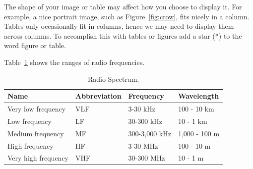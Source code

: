 \documentclass[pdf,bookmarks,colorlinks=true]{IEEEtran}
\begin{document}
The shape of your image or table may affect how you choose to display it. For example, a nice portrait image, such as Figure~\ref{fig:crow}, fits nicely in a column. Tables only occasionally fit in columns, hence we may need to display them across columns. To accomplish this with tables or figures add a star (*) to the word figure or table. 

Table~\ref{tbl:frequencies} shows the ranges of radio frequencies.

\begin{table}[htb]
    \centering
    \caption{Radio Spectrum.}
    \label{tbl:frequencies}
    \begin{tabular}{|l|l|l|l|}
        \hline
        \textbf{Name} & \textbf{Abbreviation} & \textbf{Frequency} & \textbf{Wavelength} \\
        \hline \hline
        Very low frequency & VLF & 3-30 kHz & 100 - 10 km \\ \hline
        Low frequency & LF & 30-300 kHz & 10 - 1 km \\ \hline
        Medium frequency & MF & 300-3,000 kHz & 1,000 - 100 m \\ \hline
        High frequency & HF & 3-30 MHz  & 100 - 10 m \\ \hline
        Very high frequency & VHF & 30-300 MHz & 10 - 1 m \\ \hline        
    \end{tabular}
\end{table}
\end{document}
